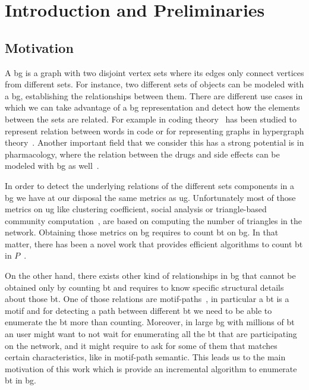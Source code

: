 \chapter{Introduction and Preliminaries}\label{chapter:1}
\section{Motivation}
A \acrfull{bg} is a graph with two disjoint vertex sets where its edges only connect vertices from different sets. 
For instance, two different sets of objects can be modeled with a \acrshort{bg}, establishing the relationships between them.
There are different use cases in which we can take advantage of a \acrshort{bg} representation and detect how the elements between the sets
are related. For example in coding theory~\cite{DBLP:journals/corr/WangL13} has been studied to represent relation between words in code 
or for representing graphs in hypergraph theory~\cite{hypergraph}. Another important field that we consider this has a strong potential is 
in pharmacology, where the relation between the drugs and side effects can be modeled with \acrshort{bg} as well~\cite{drugs}.

In order to detect the underlying relations of the different sets components in a \acrshort{bg} we have at our disposal the same metrics as \acrfull{ug}.
Unfortunately most of those metrics on \acrshort{ug} like clustering coefficient, social analysis or triangle-based community computation~\cite{ccoef,detect_graph,Newman_2003},
are based on computing the number of triangles in the network. Obtaining those metrics on \acrshort{bg} requires to count \acrfull{bt} on \acrshort{bg}.
In that matter, there has been a novel work that provides efficient algorithms to count \acrshort{bt} in $P$~\cite{btcount}.

On the other hand, there exists other kind of relationships in \acrshort{bg} that cannot be obtained only by counting \acrshort{bt} and requires to know specific
structural details about those \acrshort{bt}. One of those relations are motif-paths~\cite{Li2019MotifPA}, in particular a \acrshort{bt} is a motif and for detecting
a path between different \acrshort{bt} we need to be able to enumerate the \acrshort{bt} more than counting.
Moreover, in large \acrshort{bg} with millions of \acrshort{bt} an user might want to not wait for enumerating all the \acrshort{bt} that are participating on the network,
and it might require to ask for some of them that matches certain characteristics, like in motif-path semantic. This leads us to the main motivation of this work which is provide
an incremental algorithm to enumerate \acrlong{bt} in \acrlong{bg}.

